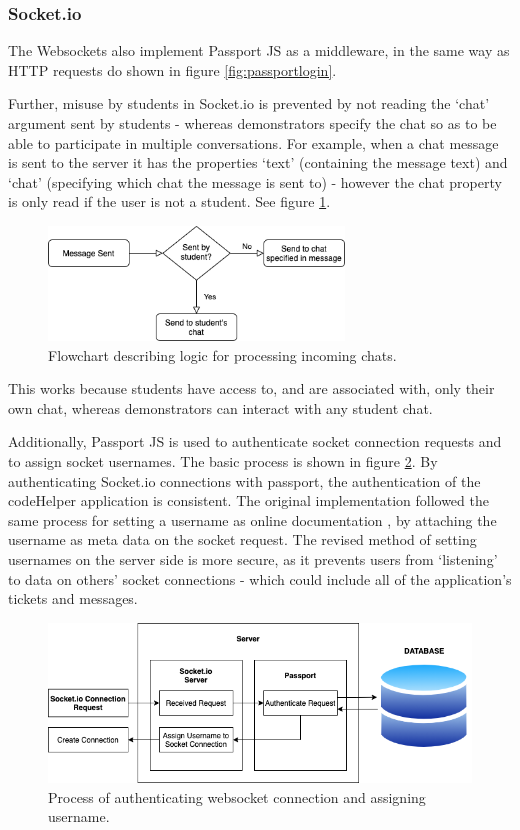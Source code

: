 \subsubsection{Socket.io}

The Websockets also implement Passport JS as a middleware, in the same way as HTTP requests do shown in figure \ref{fig:passportlogin}. 

Further, misuse by students in Socket.io is prevented by not reading the `chat' argument sent by students - whereas demonstrators specify the chat so as to be able to participate in multiple conversations. For example, when a chat message is sent to the server it has the properties `text' (containing the message text) and `chat' (specifying which chat the message is sent to) - however the chat property is only read if the user is not a student. See figure \ref{fig:socketchat}.

\begin{figure}[H]
    \centering
    \includegraphics[width=0.7\textwidth]{8implementation/images/socketiochat.png}
    \caption{Flowchart describing logic for processing incoming chats.}
    \label{fig:socketchat}
\end{figure}

This works because students have access to, and are associated with, only their own chat, whereas demonstrators can interact with any student chat.

Additionally, Passport JS is used to authenticate socket connection requests and to assign socket usernames. The basic process is shown in figure \ref{fig:socketpassport}. By authenticating Socket.io connections with passport, the authentication of the codeHelper application is consistent. The original implementation followed the same process for setting a username as online documentation \cite{socketpassport}, by attaching the username as meta data on the socket request. The revised method of setting usernames on the server side is more secure, as it prevents users from `listening' to data on others' socket connections - which could include all of the application's tickets and messages.

\begin{figure}[H]
    \centering
    \includegraphics[width=\textwidth]{8implementation/images/socketPassport.png}
    \caption{Process of authenticating websocket connection and assigning username.}
    \label{fig:socketpassport}
\end{figure}